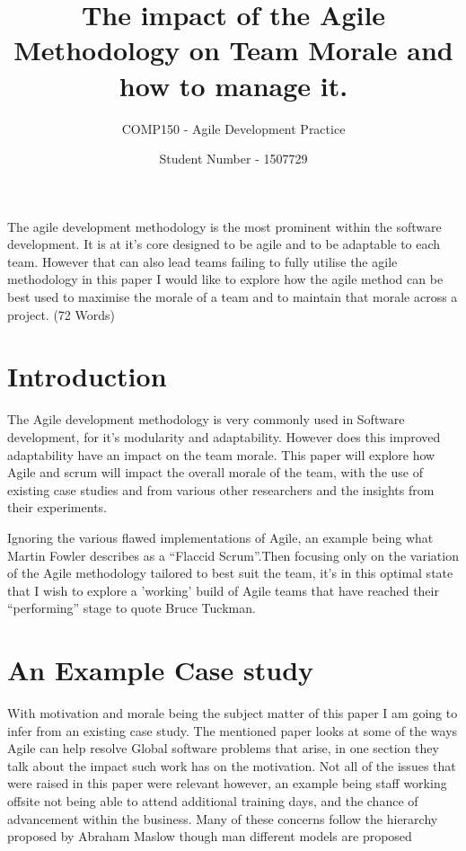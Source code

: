 \documentclass{scrartcl}
\title{The impact of the Agile Methodology on Team Morale and how to manage it.}
\subtitle{COMP150 - Agile Development Practice}
\author{Student Number - 1507729}
\begin{document}
\maketitle

\abstract The agile development methodology is the most prominent within the software development. It is at it's core designed to be agile and to be adaptable to each team. However that can also lead teams failing to fully utilise the agile methodology  in this paper I would like to explore how the agile method can be best used to maximise the morale of a team and to maintain that morale across a project. (72 Words)

\section{Introduction}

The Agile development methodology \cite{Agile} is very commonly used in Software development, for it's modularity and adaptability. However does this improved adaptability have an impact on the team morale. This paper will explore how Agile and scrum will impact the overall morale of the team, with the use of existing case studies and from various other researchers and the insights from their experiments. 

Ignoring the various flawed implementations of Agile, an example being what Martin Fowler describes as a ``Flaccid Scrum''.Then focusing only on the variation of the Agile methodology tailored to best suit the team, it's in this optimal state that I wish to explore a 'working' build of Agile teams that have reached their ``performing'' stage to quote Bruce Tuckman. 

\section{An Example Case study}

With motivation and morale being the subject matter of this paper I am going to infer from an existing case study. \cite{Globalsoftware}  The mentioned paper looks at some of the ways Agile can help resolve Global software problems that arise, in one section they talk about the impact such work has on the motivation. Not all of the issues that were raised in this paper were relevant however, an example being staff working offsite not being able to attend additional training days, and the chance of advancement within the business. Many of these concerns follow the hierarchy proposed by Abraham Maslow though man different models are proposed \cite{MotivationTeamwork} 
\end{document}
